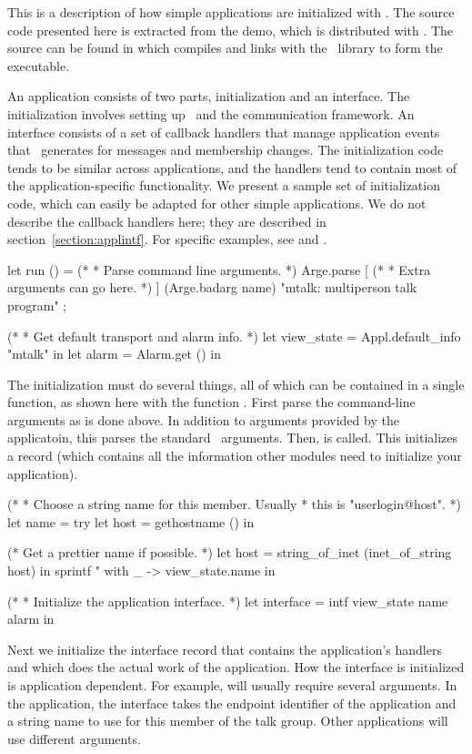 This is a description of how simple applications are initialized with \ensemble.  The
source code presented here is extracted from the  demo, which is
distributed with \ensemble.  The source can be found in  which
compiles and links with the \ensemble\ library to form the 
executable.

An application consists of two parts, initialization and an interface.  The
initialization involves setting up \ensemble\ and the communication framework.
An interface consists of a set of callback handlers that manage application
events that \ensemble\ generates for messages and membership changes.  The
initialization code tends to be similar across applications, and the handlers
tend to contain most of the application-specific functionality.  We present a
sample set of initialization code, which can easily be adapted for other simple
applications.  We do not describe the callback handlers here; they are
described in section~\ref{section:applintf}.  For specific examples, see
 and .

\begin{codebox}
let run () =
  (*
   * Parse command line arguments.
   *)
  Arge.parse [
    (*
     * Extra arguments can go here.
     *)
  ] (Arge.badarg name) "mtalk: multiperson talk program" ;

  (*
   * Get default transport and alarm info.
   *)
  let view_state = Appl.default_info "mtalk" in
  let alarm = Alarm.get () in
\end{codebox}
The initialization must do several things, all of which can be contained in a
single function, as shown here with the function .  First parse the
command-line arguments as is done above.  In addition to arguments provided by
the applicatoin, this parses the standard \ensemble\ arguments.  Then,
 is called.  This initializes a  record
(which contains all the information other modules need to initialize your
application).

\begin{codebox}    
  (*
   * Choose a string name for this member.  Usually
   * this is "userlogin@host".
   *)
  let name =
    try
      let host = gethostname () in

      (* Get a prettier name if possible.
       *)
      let host = string_of_inet (inet_of_string host) in
      sprintf "%
    with _ -> view_state.name
  in

  (*
   * Initialize the application interface.
   *)
  let interface = intf view_state name alarm in
\end{codebox}    
Next we initialize the interface record that contains the
application's handlers and which does the actual work of the
application.  How the interface is initialized is application
dependent.  For example,  will usually require
several arguments.  In the  application, the interface
takes the endpoint identifier of the application and a string name to
use for this member of the talk group.  Other applications will use
different arguments.

